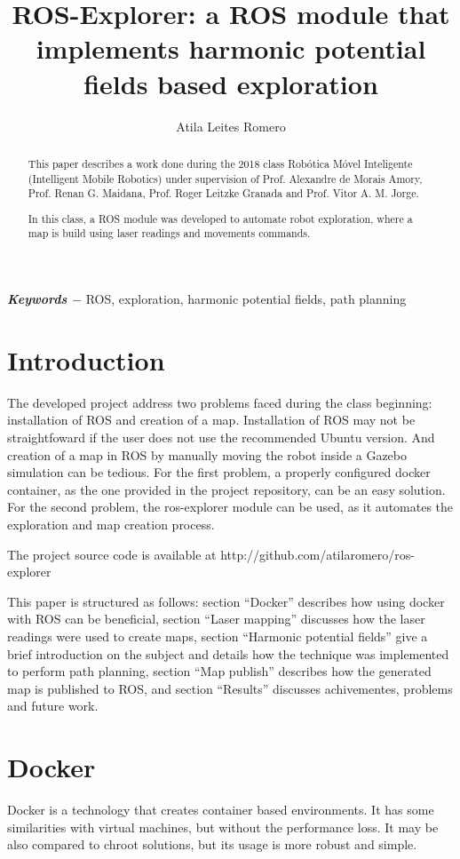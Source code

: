 \documentclass[a4paper,twocolumn]{article}
\title{ROS-Explorer: a ROS module that implements harmonic potential fields based exploration}
\author{Atila Leites Romero}
\begin{document}
\maketitle

\begin{abstract}
    This paper describes a work done during the 2018 class Robótica Móvel Inteligente (Intelligent Mobile Robotics) under supervision of Prof. Alexandre de Morais Amory, Prof. Renan G. Maidana, Prof. Roger Leitzke Granada and Prof. Vitor A. M. Jorge.
    
    In this class, a ROS module was developed to automate robot exploration, where a map is build using laser readings and movements commands.
\end{abstract}

{
    \par	
    \textbf{\textit{Keywords $-$}} 
    ROS, exploration, harmonic potential fields, path planning
}

\section{Introduction}
    The developed project address two problems faced during the class beginning: installation of ROS and creation of a map. Installation of ROS may not be straightfoward if the user does not use the recommended Ubuntu version. And creation of a map in ROS by manually moving the robot inside a Gazebo simulation can be tedious. For the first problem, a properly configured docker container, as the one provided in the project repository, can be an easy solution. For the second problem, the ros-explorer module can be used, as it automates the exploration and map creation process.

    The project source code is available at http://github.com/atilaromero/ros-explorer

    This paper is structured as follows: section ``Docker'' describes how using docker with ROS can be beneficial, section ``Laser mapping'' discusses how the laser readings were used to create maps, section ``Harmonic potential fields'' give a brief introduction on the subject and details how the technique was implemented to perform path planning, section ``Map publish'' describes how the generated map is published to ROS, and section ``Results'' discusses achivementes, problems and future work.

\section{Docker}
    Docker is a technology that creates container based environments. It has some similarities with virtual machines, but without the performance loss. It may be also compared to chroot solutions, but its usage is more robust and simple.
\end{document}
